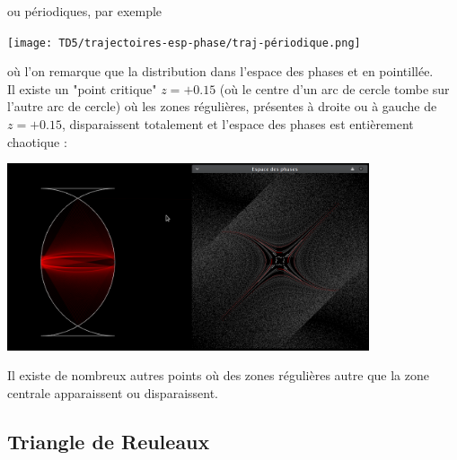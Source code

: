 \documentclass{book}
\begin{document}
\begin{correction}
\begin{center}
\end{center}
ou périodiques, par exemple
\begin{center}
\texttt{[image: TD5/trajectoires-esp-phase/traj-périodique.png]}
\end{center}
où l'on remarque que la distribution dans l'espace des phases et en pointillée.\\
Il existe un "point critique" $z=+0.15$ (où le centre d'un arc de cercle tombe sur l'autre arc de cercle) où les zones régulières, présentes à droite ou à gauche de $z=+0.15$, disparaissent totalement et l'espace des phases est entièrement chaotique :
\begin{center}
\includegraphics[width=0.8\textwidth]{TD5/trajectoires-esp-phase/traj-at-z=0.15.png}
\end{center}
Il existe de nombreux autres points où des zones régulières autre que la zone centrale apparaissent ou disparaissent.

\end{correction}

\subsection{Triangle de Reuleaux}
\end{document}
